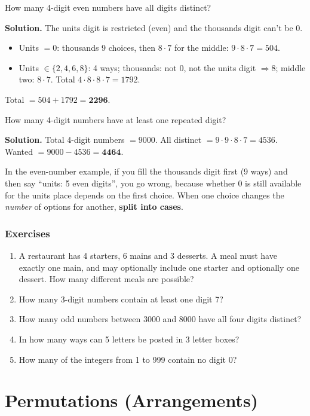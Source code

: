 \documentclass[11pt,a4paper,openany]{report}
\newenvironment{exercises}{\subsection*{Exercises \thechapter}\begin{enumerate}[label=\textbf{\thechapter.\arabic*},leftmargin=3.2em]}{\end{enumerate}}
\begin{document}
\begin{example}
How many 4-digit even numbers have all digits distinct?

\textbf{Solution.} The units digit is restricted (even) and the thousands digit can't be 0.
\begin{itemize}[nosep]
\item Units $=0$: thousands 9 choices, then $8\cdot7$ for the middle: $9\cdot8\cdot7=504$.
\item Units $\in\{2,4,6,8\}$: 4 ways; thousands: not 0, not the units digit $\Rightarrow 8$;
middle two: $8\cdot7$. Total $4\cdot8\cdot8\cdot7=1792$.
\end{itemize}
Total $=504+1792=\mathbf{2296}$.
\end{example}

\begin{example}
How many 4-digit numbers have at least one repeated digit?

\textbf{Solution.} Total 4-digit numbers $=9000$. All distinct $=9\cdot9\cdot8\cdot7=4536$.
Wanted $=9000-4536=\mathbf{4464}$.
\end{example}

\begin{trap}
In the even-number example, if you fill the thousands digit first (9 ways) and then say ``units: 5 even
digits'', you go wrong, because whether 0 is still available for the units place depends on the
first choice. When one choice changes the \emph{number} of options for another, \textbf{split into cases}.
\end{trap}

\begin{exercises}
\item A restaurant has 4 starters, 6 mains and 3 desserts. A meal must have exactly one main,
and may optionally include one starter and optionally one dessert. How many different meals are possible?
\item How many 3-digit numbers contain at least one digit 7?
\item How many odd numbers between 3000 and 8000 have all four digits distinct?
\item In how many ways can 5 letters be posted in 3 letter boxes?
\item How many of the integers from 1 to 999 contain no digit 0?
\end{exercises}

\chapter{Permutations (Arrangements)}\label{ch:perm}
\end{document}
